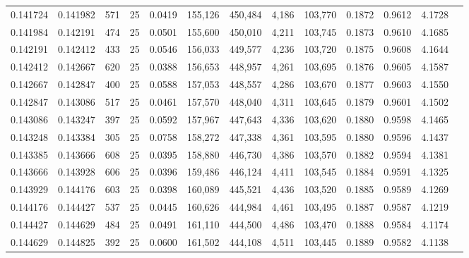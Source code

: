 \begin{tabular}{rrrrrrrrrrrrr}
0.141724 & 0.141982 &   571 &  25 &                                     0.0419 & 155,126 & 450,484 &   4,186 & 103,770 & 0.1872 & 0.9612 & 4.1728 \\
0.141984 & 0.142191 &   474 &  25 &                                     0.0501 & 155,600 & 450,010 &   4,211 & 103,745 & 0.1873 & 0.9610 & 4.1685 \\
0.142191 & 0.142412 &   433 &  25 &                                     0.0546 & 156,033 & 449,577 &   4,236 & 103,720 & 0.1875 & 0.9608 & 4.1644 \\
0.142412 & 0.142667 &   620 &  25 &                                     0.0388 & 156,653 & 448,957 &   4,261 & 103,695 & 0.1876 & 0.9605 & 4.1587 \\
0.142667 & 0.142847 &   400 &  25 &                                     0.0588 & 157,053 & 448,557 &   4,286 & 103,670 & 0.1877 & 0.9603 & 4.1550 \\
0.142847 & 0.143086 &   517 &  25 &                                     0.0461 & 157,570 & 448,040 &   4,311 & 103,645 & 0.1879 & 0.9601 & 4.1502 \\
0.143086 & 0.143247 &   397 &  25 &                                     0.0592 & 157,967 & 447,643 &   4,336 & 103,620 & 0.1880 & 0.9598 & 4.1465 \\
0.143248 & 0.143384 &   305 &  25 &                                     0.0758 & 158,272 & 447,338 &   4,361 & 103,595 & 0.1880 & 0.9596 & 4.1437 \\
0.143385 & 0.143666 &   608 &  25 &                                     0.0395 & 158,880 & 446,730 &   4,386 & 103,570 & 0.1882 & 0.9594 & 4.1381 \\
0.143666 & 0.143928 &   606 &  25 &                                     0.0396 & 159,486 & 446,124 &   4,411 & 103,545 & 0.1884 & 0.9591 & 4.1325 \\
0.143929 & 0.144176 &   603 &  25 &                                     0.0398 & 160,089 & 445,521 &   4,436 & 103,520 & 0.1885 & 0.9589 & 4.1269 \\
0.144176 & 0.144427 &   537 &  25 &                                     0.0445 & 160,626 & 444,984 &   4,461 & 103,495 & 0.1887 & 0.9587 & 4.1219 \\
0.144427 & 0.144629 &   484 &  25 &                                     0.0491 & 161,110 & 444,500 &   4,486 & 103,470 & 0.1888 & 0.9584 & 4.1174 \\
0.144629 & 0.144825 &   392 &  25 &                                     0.0600 & 161,502 & 444,108 &   4,511 & 103,445 & 0.1889 & 0.9582 & 4.1138 \\

\end{tabular}
